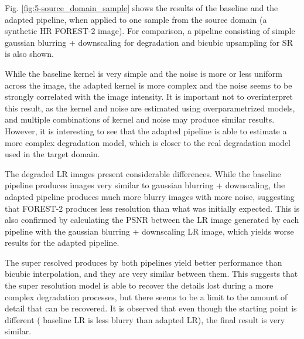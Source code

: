         Fig. \ref{fig:5-source_domain_sample} shows the results of the baseline and the adapted pipeline, when applied to one sample from the source domain (a synthetic HR FOREST-2 image). 
        For comparison, a pipeline consisting of simple gaussian blurring + downscaling for degradation and bicubic upsampling for SR is also shown. 

        While the baseline kernel is very simple and the noise is more or less uniform across the image, the adapted kernel is more complex and the noise seems to be strongly correlated with the image intensity.
        It is important not to overinterpret this result, as the kernel and noise are estimated using overparametrized models, and multiple combinations of kernel and noise may produce similar results. 
        However, it is interesting to see that the adapted pipeline is able to estimate a more complex degradation model, which is closer to the real degradation model used in the target domain.

        The degraded LR images present considerable differences. While the baseline pipeline produces images very similar to gaussian blurring + downscaling, 
        the adapted pipeline produces much more blurry images with more noise, suggesting that FOREST-2 produces less resolution than what was initially expected. 
        This is also confirmed by calculating the PSNR between the LR image generated by each pipeline with the gaussian blurring + downscaling LR image, which yields worse results for the adapted pipeline.
        
        The super resolved produces by both pipelines yield better performance than bicubic interpolation, and they are very similar between them.
        This suggests that the super resolution model is able to recover the details lost during a more complex degradation processes, but there seems to be a limit to the amount of detail that can be recovered. 
        It is observed that even though the starting point is different ( baseline LR is less blurry than adapted LR), the final result is very similar.

        
        
